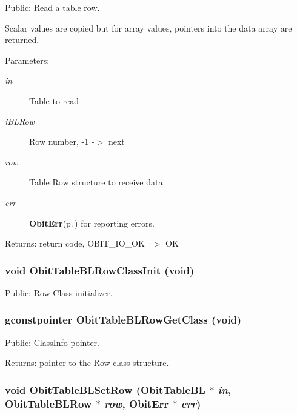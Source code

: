 Public: Read a table row. 

Scalar values are copied but for array values, pointers into the data array are returned. \begin{Desc}
\item[Parameters:]
\begin{description}
\item[{\em in}]Table to read \item[{\em i\-BLRow}]Row number, -1 -$>$ next \item[{\em row}]Table Row structure to receive data \item[{\em err}]{\bf Obit\-Err}{\rm (p.\,\pageref{structObitErr})} for reporting errors. \end{description}
\end{Desc}
\begin{Desc}
\item[Returns:]return code, OBIT\_\-IO\_\-OK=$>$ OK \end{Desc}
\subsubsection{\setlength{\rightskip}{0pt plus 5cm}void Obit\-Table\-BLRow\-Class\-Init (void)}\label{ObitTableBL_8h_a7}


Public: Row Class initializer. 

\subsubsection{\setlength{\rightskip}{0pt plus 5cm}gconstpointer Obit\-Table\-BLRow\-Get\-Class (void)}\label{ObitTableBL_8h_a9}


Public: Class\-Info pointer. 

\begin{Desc}
\item[Returns:]pointer to the Row class structure. \end{Desc}
\subsubsection{\setlength{\rightskip}{0pt plus 5cm}void Obit\-Table\-BLSet\-Row ({\bf Obit\-Table\-BL} $\ast$ {\em in}, {\bf Obit\-Table\-BLRow} $\ast$ {\em row}, {\bf Obit\-Err} $\ast$ {\em err})}\label{ObitTableBL_8h_a19}


